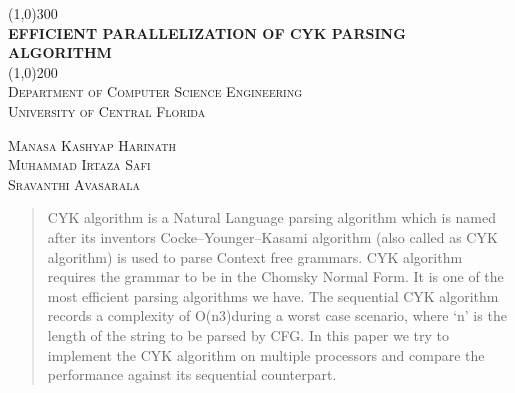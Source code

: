 \documentclass[12pt]{article}
\begin{document}
\begin{titlepage}
\begin{center}
\line(1,0){300}\\
[0.25 in]
\huge{\bfseries EFFICIENT PARALLELIZATION OF CYK PARSING ALGORITHM}\\
[0.1 cm]
\line(1,0){200}\\
[0.5 cm]
\textsc{\large Department of Computer Science Engineering}\\
\textsc{\large University of Central Florida}\\
\end{center}
\vspace{8 cm}
\begin{flushright}
\textsc{ \large Manasa Kashyap Harinath\\
         Muhammad Irtaza Safi\\
         Sravanthi Avasarala\\}
\end{flushright}
\end{titlepage}
\begin{abstract}

\large CYK algorithm is a Natural Language parsing algorithm which is named after its inventors Cocke–Younger–Kasami algorithm (also called as CYK algorithm) is used to parse Context free grammars. CYK algorithm requires the grammar to be in the Chomsky Normal Form. It is one of the most efficient parsing algorithms we have. The sequential CYK algorithm records a complexity of O(n3)during a worst case scenario, where ‘n’ is the length of the string to be parsed by CFG. In this paper we try to implement the CYK algorithm on multiple processors and compare the performance against its sequential counterpart.
\end{abstract}

\vspace{50 cm}
\end{document}
